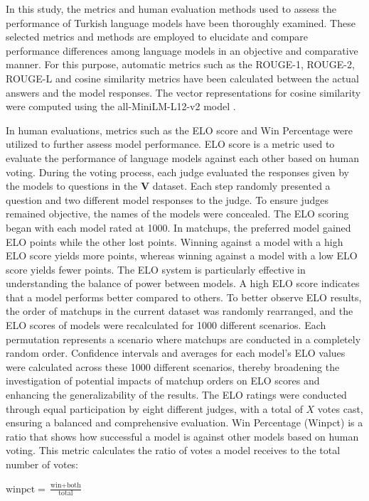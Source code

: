 \documentclass[conference]{IEEEtran}
\begin{document}
In this study, the metrics and human evaluation methods used to assess the performance of Turkish language models have been thoroughly examined. These selected metrics and methods are employed to elucidate and compare performance differences among language models in an objective and comparative manner. For this purpose, automatic metrics such as the ROUGE-1, ROUGE-2, ROUGE-L and cosine similarity metrics have been calculated between the actual answers and the model responses. The vector representations for cosine similarity were computed using the all-MiniLM-L12-v2 model \cite{sentencetransformers}.

In human evaluations, metrics such as the ELO score and Win Percentage were utilized to further assess model performance. ELO score is a metric used to evaluate the performance of language models against each other based on human voting. During the voting process, each judge evaluated the responses given by the models to questions in the $\mathbf{V}$ dataset. Each step randomly presented a question and two different model responses to the judge. To ensure judges remained objective, the names of the models were concealed. The ELO scoring began with each model rated at 1000. In matchups, the preferred model gained ELO points while the other lost points. Winning against a model with a high ELO score yields more points, whereas winning against a model with a low ELO score yields fewer points. The ELO system is particularly effective in understanding the balance of power between models. A high ELO score indicates that a model performs better compared to others. To better observe ELO results, the order of matchups in the current dataset was randomly rearranged, and the ELO scores of models were recalculated for 1000 different scenarios. Each permutation represents a scenario where matchups are conducted in a completely random order. Confidence intervals and averages for each model's ELO values were calculated across these 1000 different scenarios, thereby broadening the investigation of potential impacts of matchup orders on ELO scores and enhancing the generalizability of the results. The ELO ratings were conducted through equal participation by eight different judges, with a total of $X$ votes cast, ensuring a balanced and comprehensive evaluation. Win Percentage (Winpct) is a ratio that shows how successful a model is against other models based on human voting. This metric calculates the ratio of votes a model receives to the total number of votes:

\begin{center}
\normalsize{$\text{{winpct}} = \frac{{\text{{win}} + \text{{both}}}}{{\text{{total}}}}$}
\end{center}
\end{document}
